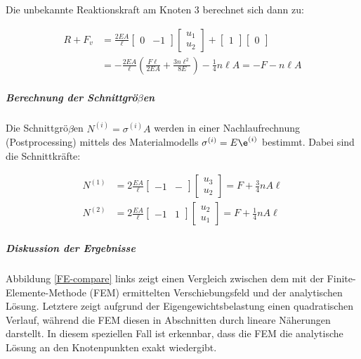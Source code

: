 Die unbekannte Reaktionskraft am Knoten 3 berechnet sich dann zu:

\begin{align}
R + F_v & = \frac{2EA}{\ell} \begin{bmatrix}
0 & -1 
\end{bmatrix} \begin{bmatrix}
u_1 \\ u_2
\end{bmatrix} + \begin{bmatrix}
1
\end{bmatrix} \begin{bmatrix}
0
\end{bmatrix} \\
&= -\frac{2EA}{\ell} \left(\frac{F\ell}{2EA} + \frac{3 n \ell^2}{8E} \right)- \frac{1}{4}n\ell A= -F - n \ell A 
\end{align}


\subparagraph{Berechnung der Schnittgrö$\beta$en}

Die Schnittgrö$\beta$en $N^{(i)}=\sigma^{(i)} A$ werden in einer Nachlaufrechnung (Postprocessing) mittels des Materialmodells $\sigma^{(i)}=E\e^{(i)}$ bestimmt. Dabei sind die Schnittkräfte:

\begin{align}
N^{(1)} & = 2\frac{EA}{\ell} \begin{bmatrix} -1 & - \end{bmatrix} \begin{bmatrix} u_3 \\ u_2 \end{bmatrix} = F + \frac{3}{4} n A \ell \\
N^{(2)} & = 2\frac{EA}{\ell} \begin{bmatrix} -1 & 1 \end{bmatrix} \begin{bmatrix} u_2 \\ u_1 \end{bmatrix}= F + \frac{1}{4} n A \ell
\end{align}

\subparagraph{Diskussion der Ergebnisse}

Abbildung \ref{FE-compare} links zeigt einen Vergleich zwischen dem mit der Finite-Elemente-Methode (FEM) ermittelten Verschiebungsfeld und der analytischen Lösung. Letztere zeigt aufgrund der Eigengewichtsbelastung einen quadratischen Verlauf, während die FEM diesen in Abschnitten durch lineare Näherungen darstellt. In diesem speziellen Fall ist erkennbar, dass die FEM die analytische Lösung an den Knotenpunkten exakt wiedergibt.


